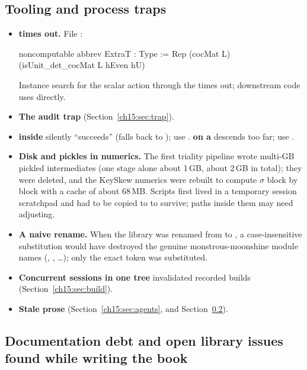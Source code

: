\subsection{Tooling and process traps}
\begin{itemize}
\item \textbf{ times out.} File :
\begin{leancode}
noncomputable abbrev ExtraT : Type := Rep (cocMat L) (isUnit_det_cocMat L hEven hU)
\end{leancode}
  Instance search for the scalar action through the  times out; downstream code uses
   directly.
\item \textbf{The audit trap}  (Section~\ref{ch15:sec:trap}).
\item \textbf{ inside } silently ``succeeds'' (falls back to );
  use . \textbf{ on a } descends too far; use
  .
\item \textbf{Disk and pickles in numerics.} The first triality pipeline wrote multi-GB pickled
  intermediates (one stage alone about 1\,GB, about 2\,GB in total); they were deleted, and the
  KeySkew numerics were rebuilt to compute $\sigma$ block by block with a cache of about 68\,MB. Scripts
  first lived in a temporary session scratchpad and had to be copied to
   to survive; paths inside them may need adjusting.
\item \textbf{A naive rename.} When the library was renamed from  to , a case-insensitive substitution would have destroyed the genuine
  monstrous-moonshine module names (, , \ldots);
  only the exact token was substituted.
\item \textbf{Concurrent sessions in one tree} invalidated recorded builds
  (Section~\ref{ch15:sec:build}).
\item \textbf{Stale prose} (Section~\ref{ch15:sec:agents}, and Section~\ref{ch15:sec:debt}).
\end{itemize}

\subsection{Documentation debt and open library issues found while writing the book}\label{ch15:sec:debt}

